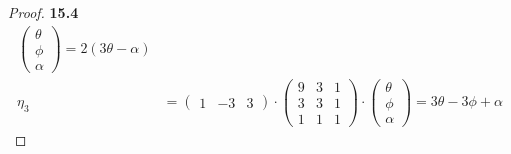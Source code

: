 \documentclass[11pt]{article}
\theoremstyle{definition}
\begin{document}
\begin{proof}{\textbf{15.4}}
\begin{align*}
\begin{pmatrix}
            \theta \\ \phi \\ \alpha
        \end{pmatrix}
        = 2(3\theta -\alpha)\\
        \eta_3 &= \begin{pmatrix}1 & -3 & 3\end{pmatrix}
        \cdot \begin{pmatrix}
            9  & 3 & 1\\
            3 & 3 & 1\\
            1 & 1 & 1
        \end{pmatrix}
        \cdot \begin{pmatrix}
            \theta \\ \phi \\ \alpha
        \end{pmatrix}
        = 3\theta - 3\phi  + \alpha
    \end{align*}
\end{proof}
\end{document}
